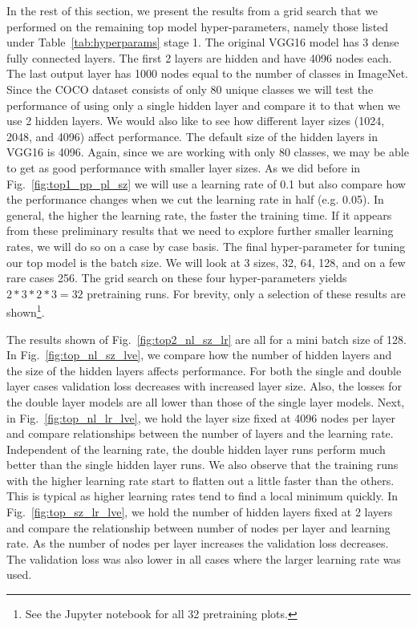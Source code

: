 \documentclass[12pt,journal,compsoc]{IEEEtran}
\begin{document}
In the rest of this section, we present the results from a grid search that we performed on the remaining top model hyper-parameters, namely those listed under Table~\ref{tab:hyperparams} stage 1. The original VGG16 model has 3 dense fully connected layers. The first 2 layers are hidden and have 4096 nodes each. The last output layer has 1000 nodes equal to the number of classes in ImageNet. Since the COCO dataset consists of only 80 unique classes we will test the performance of using only a single hidden layer and compare it to that when we use 2 hidden layers. We would also like to see how different layer sizes (1024, 2048, and 4096) affect performance. The default size of the hidden layers in VGG16 is 4096. Again, since we are working with only 80 classes, we may be able to get as good performance with smaller layer sizes. As we did before in Fig.~\ref{fig:top1_pp_pl_sz} we will use a learning rate of 0.1 but also compare how the performance changes when we cut the learning rate in half (e.g. 0.05). In general, the higher the learning rate, the faster the training time. If it appears from these preliminary results that we need to explore further smaller learning rates, we will do so on a case by case basis. The final hyper-parameter for tuning our top model is the batch size. We will look at 3 sizes, 32, 64, 128, and on a few rare cases 256. The grid search on these four hyper-parameters yields $2*3*2*3 = 32$ pretraining runs. For brevity, only a selection of these results are shown\footnote{See the Jupyter notebook for all 32 pretraining plots.}. 

The results shown of Fig.~\ref{fig:top2_nl_sz_lr} are all for a mini batch size of 128. In Fig.~\ref{fig:top_nl_sz_lve}, we compare how the number of hidden layers and the size of the hidden layers affects performance. For both the single and double layer cases validation loss decreases with increased layer size. Also, the losses for the double layer models are all lower than those of the single layer models. Next, in Fig.~\ref{fig:top_nl_lr_lve}, we hold the layer size fixed at 4096 nodes per layer and compare relationships between the number of layers and the learning rate. Independent of the learning rate, the double hidden layer runs perform much better than the single hidden layer runs. We also observe that the training runs with the higher learning rate start to flatten out a little faster than the others. This is typical as higher learning rates tend to find a local minimum quickly. In Fig.~\ref{fig:top_sz_lr_lve}, we hold the number of hidden layers fixed at 2 layers and compare the relationship between number of nodes per layer and learning rate. As the number of nodes per layer increases the validation loss decreases. The validation loss was also lower in all cases where the larger learning rate was used. 
\end{document}
